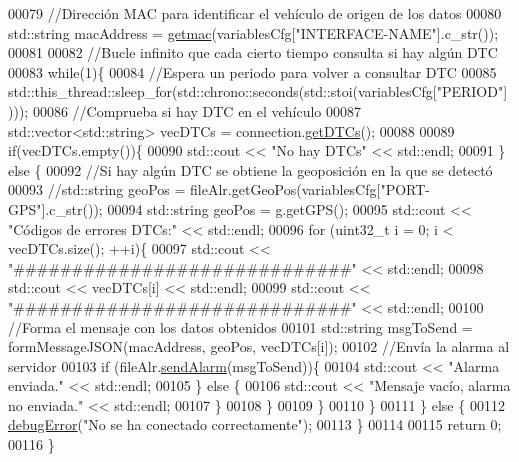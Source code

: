 \begin{DoxyCode}
00079         \textcolor{comment}{//Dirección MAC para identificar el vehículo de origen de los datos}
00080         std::string macAddress = \hyperlink{loadcfg_8cpp_ae4db05d33445e6b6ca0c4a6a0ba23bf3}{getmac}(variablesCfg[\textcolor{stringliteral}{"INTERFACE-NAME"}].c\_str());
00081 
00082         \textcolor{comment}{//Bucle infinito que cada cierto tiempo consulta si hay algún DTC}
00083         \textcolor{keywordflow}{while}(1)\{
00084             \textcolor{comment}{//Espera un periodo para volver a consultar DTC}
00085             std::this\_thread::sleep\_for(std::chrono::seconds(std::stoi(variablesCfg[\textcolor{stringliteral}{"PERIOD"}])));
00086             \textcolor{comment}{//Comprueba si hay DTC en el vehículo}
00087             std::vector<std::string> vecDTCs = connection.\hyperlink{classObd_ac57afb9228d933c6be5b2fa8e6446036}{getDTCs}();
00088 
00089             \textcolor{keywordflow}{if}(vecDTCs.empty())\{
00090                 std::cout << \textcolor{stringliteral}{"No hay DTCs"} << std::endl;
00091             \} \textcolor{keywordflow}{else} \{
00092                 \textcolor{comment}{//Si hay algún DTC se obtiene la geoposición en la que se detectó}
00093                 \textcolor{comment}{//std::string geoPos = fileAlr.getGeoPos(variablesCfg["PORT-GPS"].c\_str());}
00094                 std::string geoPos = g.getGPS();
00095                 std::cout << \textcolor{stringliteral}{"Códigos de errores DTCs:"} << std::endl;
00096                 \textcolor{keywordflow}{for} (uint32\_t i = 0; i < vecDTCs.size(); ++i)\{
00097                     std::cout <<  \textcolor{stringliteral}{"#############################"} << std::endl;
00098                     std::cout <<  vecDTCs[i] << std::endl;
00099                     std::cout <<  \textcolor{stringliteral}{"#############################"} << std::endl;
00100                     \textcolor{comment}{//Forma el mensaje con los datos obtenidos}
00101                     std::string msgToSend = formMessageJSON(macAddress, geoPos, vecDTCs[i]);
00102                     \textcolor{comment}{//Envía la alarma al servidor}
00103                     \textcolor{keywordflow}{if} (fileAlr.\hyperlink{classAlarmFile_a37fd701cca3c3458a3009b508383947b}{sendAlarm}(msgToSend))\{
00104                         std::cout << \textcolor{stringliteral}{"Alarma enviada."} << std::endl;
00105                     \} \textcolor{keywordflow}{else} \{
00106                         std::cout << \textcolor{stringliteral}{"Mensaje vacío, alarma no enviada."} << std::endl;
00107                     \}                   
00108                 \}
00109             \}
00110         \}
00111     \} \textcolor{keywordflow}{else} \{
00112         \hyperlink{debug_8hpp_a06cd512b8b15b6da31a5a557445f7027}{debugError}(\textcolor{stringliteral}{"No se ha conectado correctamente"});
00113     \}
00114 
00115     \textcolor{keywordflow}{return} 0;
00116 \}
\end{DoxyCode}
